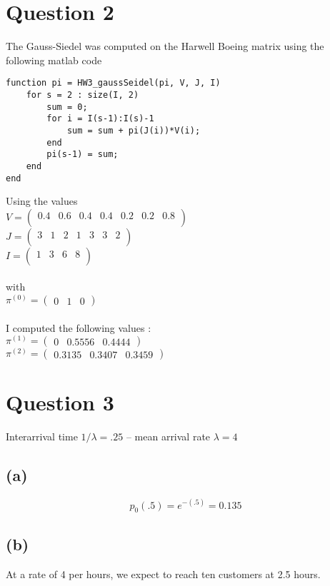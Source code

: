 \documentclass{article}
\begin{document}
\section*{Question 2}
The Gauss-Siedel was computed on the Harwell Boeing matrix using the following
matlab code 
\begin{lstlisting}[frame=single] 
 function pi = HW3_gaussSeidel(pi, V, J, I)
    for s = 2 : size(I, 2)  
        sum = 0;
        for i = I(s-1):I(s)-1
            sum = sum + pi(J(i))*V(i);
        end  
        pi(s-1) = sum;
    end
end 
\end{lstlisting}
Using the values \\
$ V = \left(\begin{array}{ccccccc}
	0.4 & 0.6 & 0.4 & 0.4 & 0.2 & 0.2 & 0.8 \\
\end{array}\right)$\\
$ J    = \left(\begin{array}{ccccccc}
	3 & 1 & 2 & 1 & 3 & 3 & 2 \\
\end{array}\right)$\\
$ I   = \left(\begin{array}{cccc}
	1 & 3 & 6 & 8 \\
\end{array}\right)$\\
\\
with \\
$\pi^{(0)} = \left(\begin{array}{ccc}
	0 & 1 & 0
\end{array}\right)$ \\ 
\\
I computed the following values :\\
$\pi^{(1)} = \left(\begin{array}{ccc}
	0  &  0.5556  &  0.4444
\end{array}\right)$ \\ 
$\pi^{(2)} = \left(\begin{array}{ccc}
0.3135   & 0.3407  &  0.3459
\end{array}\right)$ \\ 

\section*{Question 3}
Interarrival time $1/\lambda = .25$ -- mean arrival rate
$\lambda = 4$ \subsection*{(a)}
\[ p_{0}(.5) = e^{-(.5)} = 0.135 \]
\subsection*{(b)}
At a rate of 4 per hours, we expect to reach ten customers at 2.5 hours. 
\sub
\end{document}
